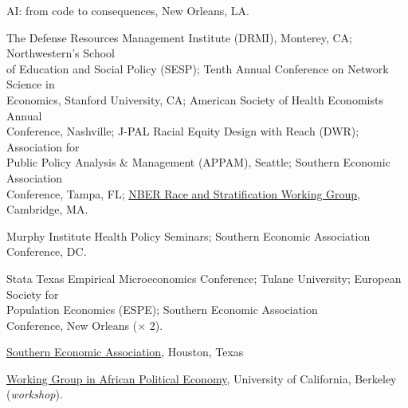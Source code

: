 \documentclass[letterpaper]{article}
\renewenvironment{itemize}{
  \begin{list}{}{
    \setlength{\leftmargin}{1.5em}
  }
}{
  \end{list}
}
\begin{document}
\begin{itemize}
\item {}AI: from code to consequences, New Orleans, LA.
\item {}The Defense Resources Management Institute (DRMI), Monterey, CA; Northwestern’s School \\{\makebox[1.8cm]{\hfill}}of Education and Social Policy (SESP); Tenth Annual Conference on Network Science in  \\{\makebox[1.8cm]{\hfill}}Economics, Stanford University, CA; American Society of Health Economists Annual \\{\makebox[1.8cm]{\hfill}}Conference, Nashville; J-PAL Racial Equity Design with Reach (DWR); Association for \\{\makebox[1.8cm]{\hfill}}Public Policy Analysis \& Management (APPAM), Seattle; Southern Economic Association \\{\makebox[1.8cm]{\hfill}}Conference, Tampa, FL; \href{https://www.youtube.com/live/9j5VG4eZet8?si=H-wQVlJr51r37lvT&t=20353}{NBER Race and Stratification Working Group}, Cambridge, MA.
\item {}Murphy Institute Health Policy Seminars; Southern Economic Association \\{\makebox[1.8cm]{\hfill}}Conference, DC.
\item {}Stata Texas Empirical Microeconomics Conference; Tulane University; European Society for \\{\makebox[1.8cm]{\hfill}}Population Economics (ESPE); Southern Economic Association \\{\makebox[1.8cm]{\hfill}}Conference, New Orleans ($\times$ 2).
\item {}\href{https://www.southerneconomic.org/session-details/?conferenceId=7&eventId=3353}%
{Southern Economic Association}, Houston, Texas
\item {}\href{https://cega.berkeley.edu/initiative/working-group-in-african-political-economy/}%
{Working Group in African Political Economy}, University of  California, Berkeley (\textit{workshop}).

\end{itemize}

\vspace{2 mm}
\end{document}
